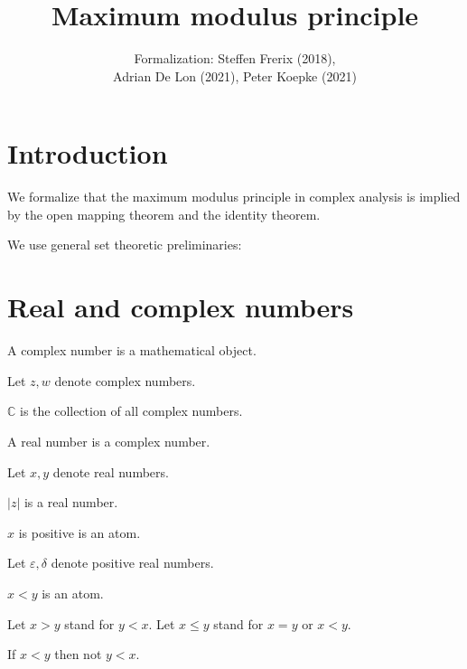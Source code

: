 \documentclass{article}
\title{Maximum modulus principle}
\author{\Naproche{} Formalization: Steffen Frerix (2018),\\
Adrian De Lon (2021), Peter Koepke (2021)}
\date{}
\begin{document}

  \maketitle


  \section{Introduction}

We formalize that the maximum modulus principle in complex analysis is
implied by the open mapping theorem and the identity theorem.

We use general set theoretic preliminaries:

\begin{forthel}
\end{forthel}

\section{Real and complex numbers}

\begin{forthel}
\begin{signature}
      A complex number is a mathematical object.
\end{signature}

Let $z, w$ denote complex numbers.

\begin{definition}
$\mathbb{C}$ is the collection of all complex numbers.
\end{definition}

\begin{signature}
      A real number is a complex number.
\end{signature}

Let $x,y$ denote real numbers.

\begin{signature}
      $|z|$ is a real number.
\end{signature}

\begin{signature}
      $x$ is positive is an atom.
\end{signature}

Let $\varepsilon, \delta$ denote positive real numbers.

    \begin{signature}
      $x < y$ is an atom.
    \end{signature}
    Let $x > y$ stand for $y < x$.
    Let $x \leq y$ stand for $x = y$ or $x < y$.

    \begin{axiom}
      If $x < y$ then not $y < x$.
    \end{axiom}
  \end{forthel}
\end{document}
